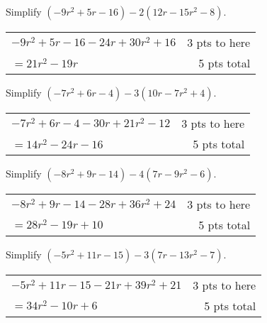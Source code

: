 {
	Simplify $(-9r^2+5r-16)-2(12r-15r^2-8)$.
}
{
	\begin{tabular}{l r}
	$-9r^2+5r-16-24r+30r^2+16$  & 3 pts to here\\
	$=21r^2-19r$ & 5 pts total\\
	\end{tabular}
}

{
	Simplify $(-7r^2+6r-4)-3(10r-7r^2+4)$.
}
{
	\begin{tabular}{l r}
	$-7r^2+6r-4-30r+21r^2-12$  & 3 pts to here\\
	$=14r^2-24r-16$ & 5 pts total\\
	\end{tabular}
}

{
	Simplify $(-8r^2+9r-14)-4(7r-9r^2-6)$.
}
{
	\begin{tabular}{l r}
	$-8r^2+9r-14-28r+36r^2+24$  & 3 pts to here\\
	$=28r^2-19r+10$ & 5 pts total\\
	\end{tabular}
}

{
	Simplify $(-5r^2+11r-15)-3(7r-13r^2-7)$.
}
{
	\begin{tabular}{l r}
	$-5r^2+11r-15-21r+39r^2+21$  & 3 pts to here\\
	$=34r^2-10r+6$ & 5 pts total\\
	\end{tabular}
}